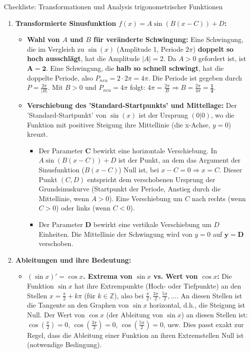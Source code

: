 \begin{loesungsumgebung}{Checkliste: Transformationen und Analysis trigonometrischer Funktionen}

\begin{enumerate}[label=(\alph*)]
    \item \textbf{Transformierte Sinusfunktion $f(x) = A \sin(B(x-C)) + D$:}
    \begin{itemize}
        \item \textbf{Wahl von $A$ und $B$ für veränderte Schwingung:}
        Eine Schwingung, die im Vergleich zu $\sin(x)$ (Amplitude 1, Periode $2\pi$) \textbf{doppelt so hoch ausschlägt}, hat die Amplitude $|A|=2$. Da $A>0$ gefordert ist, ist $\mathbf{A=2}$.
        Eine Schwingung, die \textbf{halb so schnell schwingt}, hat die doppelte Periode, also $P_{neu} = 2 \cdot 2\pi = 4\pi$. Die Periode ist gegeben durch $P = \frac{2\pi}{|B|}$. Mit $B>0$ und $P_{neu}=4\pi$ folgt:
        $4\pi = \frac{2\pi}{B} \Rightarrow B = \frac{2\pi}{4\pi} = \mathbf{\frac{1}{2}}$.

        \item \textbf{Verschiebung des 'Standard-Startpunkts' und Mittellage:}
        Der 'Standard-Startpunkt' von $\sin(x)$ ist der Ursprung $(0|0)$, wo die Funktion mit positiver Steigung ihre Mittellinie (die x-Achse, $y=0$) kreuzt.
        \begin{itemize}
            \item Der Parameter $\mathbf{C}$ bewirkt eine horizontale Verschiebung. In $A \sin(B(x-C))+D$ ist der Punkt, an dem das Argument der Sinusfunktion ($B(x-C)$) Null ist, bei $x-C=0 \Rightarrow x=C$. Dieser Punkt $(C,D)$ entspricht dem verschobenen Ursprung der Grundsinuskurve (Startpunkt der Periode, Anstieg durch die Mittellinie, wenn $A>0$). Eine Verschiebung um $C$ nach rechts (wenn $C>0$) oder links (wenn $C<0$).
            \item Der Parameter $\mathbf{D}$ bewirkt eine vertikale Verschiebung um $D$ Einheiten. Die Mittellinie der Schwingung wird von $y=0$ auf $\mathbf{y=D}$ verschoben.
        \end{itemize}
    \end{itemize}

    \item \textbf{Ableitungen und ihre Bedeutung:}
    \begin{itemize}
        \item \textbf{$(\sin x)' = \cos x$. Extrema von $\sin x$ vs. Wert von $\cos x$:}
        Die Funktion $\sin x$ hat ihre Extrempunkte (Hoch- oder Tiefpunkte) an den Stellen $x = \frac{\pi}{2} + k\pi$ (für $k \in \mathbb{Z}$), also bei $\frac{\pi}{2}, \frac{3\pi}{2}, \frac{5\pi}{2}, \dots$.
        An diesen Stellen ist die Tangente an den Graphen von $\sin x$ horizontal, d.h., die Steigung ist Null.
        Der Wert von $\cos x$ (der Ableitung von $\sin x$) an diesen Stellen ist:
        $\cos(\frac{\pi}{2}) = 0$, $\cos(\frac{3\pi}{2}) = 0$, $\cos(\frac{5\pi}{2}) = 0$, usw.
        Dies passt exakt zur Regel, dass die Ableitung einer Funktion an ihren Extremstellen Null ist (notwendige Bedingung).


\end{itemize}
\end{enumerate}
\end{loesungsumgebung}
